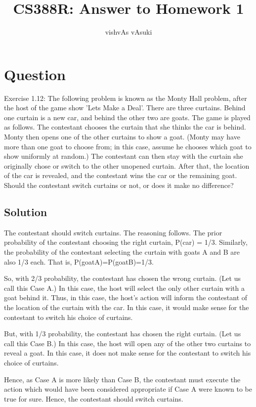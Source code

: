 \documentclass[10pt]{article}
\title{CS388R: Answer to Homework 1}
\author{vishvAs vAsuki}
\begin{document}
\maketitle

\section{Question}

Exercise 1.12: The following problem is known as the Monty Hall problem, after the host of the game show 'Lets Make a Deal'. There are three curtains. Behind one curtain is a new car, and behind the other two are goats. The game is played as follows. The contestant chooses the curtain that she thinks the car is behind. Monty then opens one of the other curtains to show a goat. (Monty may have more than one goat to choose from; in this case, assume he chooses which goat to show uniformly at random.) The contestant can then stay with the curtain she originally chose or switch to the other unopened curtain. After that, the location of the car is revealed, and the contestant wins the car or the remaining goat. Should the contestant switch curtains or not, or does it make no difference?

\subsection{Solution}

The contestant should switch curtains. The reasoning follows. The prior probability of the contestant choosing the right curtain, P(car) = 1/3. Similarly, the probability of the contestant selecting the curtain with goats A and B are also 1/3 each. That is, P(goatA)=P(goatB)=1/3.

So, with 2/3 probability, the contestant has chosen the wrong curtain. (Let us call this Case A.) In this case, the host will select the only other curtain with a goat behind it. Thus, in this case, the host's action will inform the contestant of the location of the curtain with the car. In this case, it would make sense for the contestant to switch his choice of curtains. 

But, with 1/3 probability, the contestant has chosen the right curtain. (Let us call this Case B.) In this case, the host will open any of the other two curtains to reveal a goat. In this case, it does not make sense for the contestant to switch his choice of curtains.

Hence, as Case A is more likely than Case B, the contestant must execute the action which would have been considered appropriate if Case A were known to be true for sure. Hence, the contestant should switch curtains.
\end{document}
